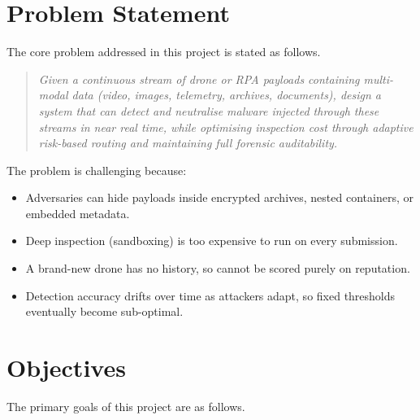 \documentclass[12pt, a4paper]{report}
\begin{document}
\section{Problem Statement}

The core problem addressed in this project is stated as follows.

\begin{quote}
\emph{Given a continuous stream of drone or RPA payloads containing
multi-modal data (video, images, telemetry, archives, documents), design a
system that can detect and neutralise malware injected through these streams
in near real time, while optimising inspection cost through adaptive
risk-based routing and maintaining full forensic auditability.}
\end{quote}

The problem is challenging because:

\begin{itemize}
    \item Adversaries can hide payloads inside encrypted archives, nested
          containers, or embedded metadata.
    \item Deep inspection (sandboxing) is too expensive to run on every
          submission.
    \item A brand-new drone has no history, so cannot be scored purely on
          reputation.
    \item Detection accuracy drifts over time as attackers adapt, so fixed
          thresholds eventually become sub-optimal.
\end{itemize}

\section{Objectives}

The primary goals of this project are as follows.
\end{document}
